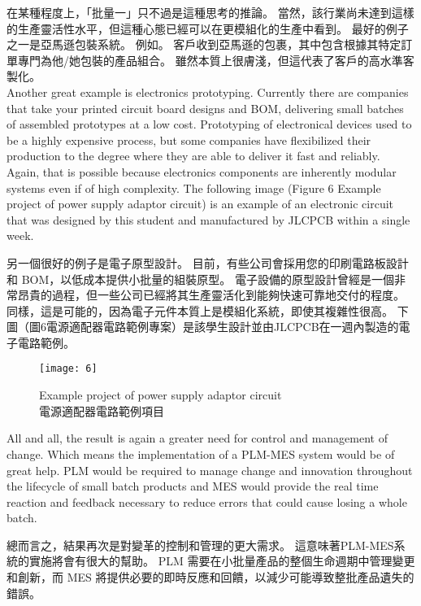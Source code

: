\fontsize{14pt}{5pt}\sectionef
 {在某種程度上，「批量一」只不過是這種思考的推論。 當然，該行業尚未達到這樣的生產靈活性水平，但這種心態已經可以在更模組化的生產中看到。 最好的例子之一是亞馬遜包裝系統。 例如。 客戶收到亞馬遜的包裹，其中包含根據其特定訂單專門為他/她包裝的產品組合。 雖然本質上很膚淺，但這代表了客戶的高水準客製化。}\\[15pt]

\fontsize{14pt}{2.5pt}\sectionef 
{Another great example is electronics prototyping. Currently there are companies that take your printed circuit board designs and BOM, delivering small batches of assembled prototypes at a low cost. Prototyping of electronical devices used to be a highly expensive process, but some companies have flexibilized their production to the degree where they are able to deliver it fast and reliably. Again, that is possible because electronics components are inherently modular systems even if of high complexity. The following image (Figure 6 Example project of power supply adaptor circuit) is an example of an electronic circuit that was designed by this student and manufactured by JLCPCB within a single week.}

\fontsize{14pt}{5pt}\sectionef
 {另一個很好的例子是電子原型設計。 目前，有些公司會採用您的印刷電路板設計和 BOM，以低成本提供小批量的組裝原型。 電子設備的原型設計曾經是一個非常昂貴的過程，但一些公司已經將其生產靈活化到能夠快速可靠地交付的程度。 同樣，這是可能的，因為電子元件本質上是模組化系統，即使其複雜性很高。 下圖（圖6電源適配器電路範例專案）是該學生設計並由JLCPCB在一週內製造的電子電路範例。}\\[15pt]
\newpage

\begin{figure}[hbt!]
\begin{center}
\texttt{[image: 6]}
\caption{\large Example project of power supply adaptor circuit\\電源適配器電路範例項目}\label{fig.6}
\end{center}
\end{figure}

\fontsize{14pt}{2.5pt}\sectionef 
{All and all, the result is again a greater need for control and management of change. Which means the implementation of a PLM-MES system would be of great help. PLM would be required to manage change and innovation throughout the lifecycle of small batch products and MES would provide the real time reaction and feedback necessary to reduce errors that could cause losing a whole batch.
}

\fontsize{14pt}{5pt}\sectionef
 {總而言之，結果再次是對變革的控制和管理的更大需求。 這意味著PLM-MES系統的實施將會有很大的幫助。 PLM 需要在小批量產品的整個生命週期中管理變更和創新，而 MES 將提供必要的即時反應和回饋，以減少可能導致整批產品遺失的錯誤。}\\[15pt]